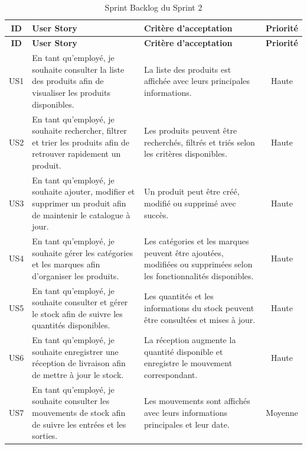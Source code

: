 \begin{longtable}{|c|>{\RaggedRight\arraybackslash}p{5cm}|>{\RaggedRight\arraybackslash}p{5cm}|c|}
\caption{Sprint Backlog du Sprint 2}
\label{tab:sprint2-backlog}\\
    \hline
\textbf{ID} & \textbf{User Story} & \textbf{Critère d'acceptation} & \textbf{Priorité}\\
\hline
\endfirsthead

\hline
\textbf{ID} & \textbf{User Story} & \textbf{Critère d'acceptation} & \textbf{Priorité}\\
\hline
\endhead


US1 &
En tant qu'employé, je souhaite consulter la liste des produits afin de visualiser les produits disponibles. &
La liste des produits est affichée avec leurs principales informations. &
Haute
\\
\hline


US2 &
En tant qu'employé, je souhaite rechercher, filtrer et trier les produits afin de retrouver rapidement un produit. &
Les produits peuvent être recherchés, filtrés et triés selon les critères disponibles. &
Haute
\\
\hline


US3 &
En tant qu'employé, je souhaite ajouter, modifier et supprimer un produit afin de maintenir le catalogue à jour. &
Un produit peut être créé, modifié ou supprimé avec succès. &
Haute
\\
\hline


US4 &
En tant qu'employé, je souhaite gérer les catégories et les marques afin d'organiser les produits. &
Les catégories et les marques peuvent être ajoutées, modifiées ou supprimées selon les fonctionnalités disponibles. &
Haute
\\
\hline


US5 &
En tant qu'employé, je souhaite consulter et gérer le stock afin de suivre les quantités disponibles. &
Les quantités et les informations du stock peuvent être consultées et mises à jour. &
Haute
\\
\hline


US6 &
En tant qu'employé, je souhaite enregistrer une réception de livraison afin de mettre à jour le stock. &
La réception augmente la quantité disponible et enregistre le mouvement correspondant. &
Haute
\\
\hline


US7 &
En tant qu'employé, je souhaite consulter les mouvements de stock afin de suivre les entrées et les sorties. &
Les mouvements sont affichés avec leurs informations principales et leur date. &
Moyenne
\\
\hline



\end{longtable}
